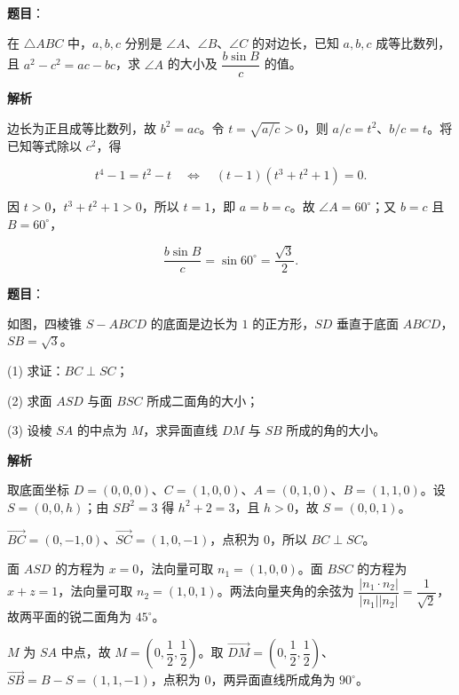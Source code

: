 \begin{answer}

\textbf{题目}：

在 $\triangle ABC$ 中，$a,b,c$ 分别是 $\angle A$、$\angle B$、$\angle C$ 的对边长，已知 $a,b,c$ 成等比数列，且 $a^2-c^2=ac-bc$，求 $\angle A$ 的大小及 $\dfrac{b\sin B}{c}$ 的值。

\textbf{解析}

边长为正且成等比数列，故 $b^2=ac$。令 $t=\sqrt{a/c}>0$，则 $a/c=t^2$、$b/c=t$。将已知等式除以 $c^2$，得

\nopagebreak[4]
\[
t^4-1=t^2-t
\quad\Longleftrightarrow\quad
(t-1)(t^3+t^2+1)=0.
\]

因 $t>0$，$t^3+t^2+1>0$，所以 $t=1$，即 $a=b=c$。故 $\angle A=60^\circ$；又 $b=c$ 且 $B=60^\circ$，

\nopagebreak[4]
\[
\frac{b\sin B}{c}=\sin60^\circ=\frac{\sqrt3}{2}.
\]


\end{answer}
\begin{answer}

\textbf{题目}：

如图，四棱锥 $S-ABCD$ 的底面是边长为 $1$ 的正方形，$SD$ 垂直于底面 $ABCD$，$SB=\sqrt3$。

(1) 求证：$BC\perp SC$；

(2) 求面 $ASD$ 与面 $BSC$ 所成二面角的大小；

(3) 设棱 $SA$ 的中点为 $M$，求异面直线 $DM$ 与 $SB$ 所成的角的大小。
\nopagebreak[4]
\begin{center}\end{center}
\nopagebreak[4]
\textbf{解析}

取底面坐标 $D=(0,0,0)$、$C=(1,0,0)$、$A=(0,1,0)$、$B=(1,1,0)$。设 $S=(0,0,h)$；由 $SB^2=3$ 得 $h^2+2=3$，且 $h>0$，故 $S=(0,0,1)$。


$\overrightarrow{BC}=(0,-1,0)$、$\overrightarrow{SC}=(1,0,-1)$，点积为 $0$，所以 $BC\perp SC$。


面 $ASD$ 的方程为 $x=0$，法向量可取 $n_1=(1,0,0)$。面 $BSC$ 的方程为 $x+z=1$，法向量可取 $n_2=(1,0,1)$。两法向量夹角的余弦为 $\dfrac{|n_1\cdot n_2|}{|n_1||n_2|}=\dfrac1{\sqrt2}$，故两平面的锐二面角为 $45^\circ$。


$M$ 为 $SA$ 中点，故 $M=(0,\dfrac12,\dfrac12)$。取 $\overrightarrow{DM}=(0,\dfrac12,\dfrac12)$、$\overrightarrow{SB}=B-S=(1,1,-1)$，点积为 $0$，两异面直线所成角为 $90^\circ$。




\end{answer}
